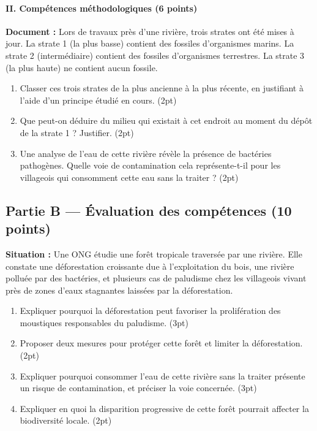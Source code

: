 \paragraph{II. Compétences méthodologiques (6 points)}
\noindent\textbf{Document :} Lors de travaux près d'une rivière, trois strates ont
été mises à jour. La strate 1 (la plus basse) contient des fossiles d'organismes
marins. La strate 2 (intermédiaire) contient des fossiles d'organismes terrestres. La
strate 3 (la plus haute) ne contient aucun fossile.
\begin{enumerate}[label=\arabic*)]
\item Classer ces trois strates de la plus ancienne à la plus récente, en justifiant
à l'aide d'un principe étudié en cours. \hfill (2pt)
\item Que peut-on déduire du milieu qui existait à cet endroit au moment du dépôt de
la strate 1 ? Justifier. \hfill (2pt)
\item Une analyse de l'eau de cette rivière révèle la présence de bactéries
pathogènes. Quelle voie de contamination cela représente-t-il pour les villageois qui
consomment cette eau sans la traiter ? \hfill (2pt)
\end{enumerate}

\subsection*{Partie B — Évaluation des compétences (10 points)}

\noindent\textbf{Situation :} Une ONG étudie une forêt tropicale traversée par une
rivière. Elle constate une déforestation croissante due à l'exploitation du bois, une
rivière polluée par des bactéries, et plusieurs cas de paludisme chez les villageois
vivant près de zones d'eaux stagnantes laissées par la déforestation.

\begin{enumerate}[label=\textbf{Tâche \arabic*.}, leftmargin=2.2cm]
\item Expliquer pourquoi la déforestation peut favoriser la prolifération des
moustiques responsables du paludisme. \hfill (3pt)
\item Proposer deux mesures pour protéger cette forêt et limiter la déforestation.
\hfill (2pt)
\item Expliquer pourquoi consommer l'eau de cette rivière sans la traiter présente un
risque de contamination, et préciser la voie concernée. \hfill (3pt)
\item Expliquer en quoi la disparition progressive de cette forêt pourrait affecter
la biodiversité locale. \hfill (2pt)
\end{enumerate}


